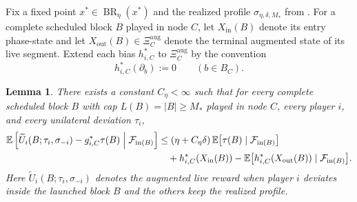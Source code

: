 \documentclass[12pt]{article}
\newtheorem{lemma}[theorem]{Lemma}
\theoremstyle{definition}
\newcommand{\E}{\mathbb{E}}
\newcommand{\1}{\mathbf{1}}
\newcommand{\cF}{\mathcal{F}}
\DeclareMathOperator{\BR}{BR}
\begin{document}
Fix a fixed point $x^*\in\BR_\eta(x^*)$ and the realized profile
$\sigma_{\eta,\delta,M_*}$ from . For a complete scheduled
block $B$ played in node $C$, let $X_{\mathrm{in}}(B)$ denote its entry
phase-state and let $X_{\mathrm{out}}(B)\in\Xi_C^{\mathrm{aug}}$ denote the
terminal augmented state of its live segment. Extend each bias $h_{i,C}^*$ to
$\Xi_C^{\mathrm{aug}}$ by the convention
\[
h_{i,C}^*(\partial_b):=0
\qquad (b\in B_C).
\]

\begin{lemma}
\label{lem:block-bellman}
There exists a constant $C_\eta<\infty$ such that for every complete scheduled
block $B$ with cap $L(B)=|B|\ge M_*$ played in node $C$, every player $i$, and
every unilateral deviation $\tau_i$,
\begin{equation}
\label{eq:block-bellman-ineq}
\begin{aligned}
\E\left[
\widetilde U_i(B;\tau_i,\sigma_{-i}) - g_{i,C}^*\tau(B)
\Bigm|\cF_{\mathrm{in}(B)}
\right]
&\le
(\eta+C_\eta\delta)\,\E\bigl[\tau(B)\mid \cF_{\mathrm{in}(B)}\bigr]
\\
&\quad+
h_{i,C}^*(X_{\mathrm{in}}(B))
-
\E\bigl[h_{i,C}^*(X_{\mathrm{out}}(B))\mid\cF_{\mathrm{in}(B)}\bigr].
\end{aligned}
\end{equation}
Here $\widetilde U_i(B;\tau_i,\sigma_{-i})$ denotes the augmented live reward when
player $i$ deviates inside the launched block $B$ and the others keep the
realized profile.
\end{lemma}
\end{document}
